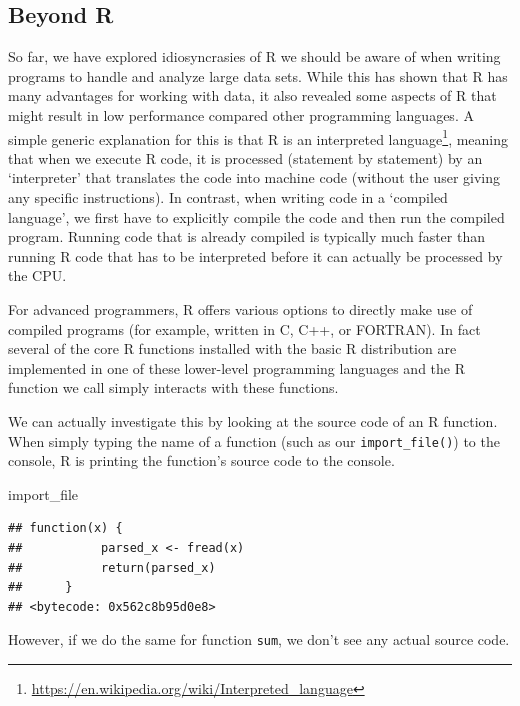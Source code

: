\documentclass[
  12pt,
]{style/krantz}
\newenvironment{Shaded}{\begin{snugshade}}{\end{snugshade}}
\newcommand{\NormalTok}[1]{#1}
\renewcommand{\href}[2]{#2\footnote{\url{#1}}}
\begin{document}
\hypertarget{beyond-r}{%
\subsection{Beyond R}\label{beyond-r}}

So far, we have explored idiosyncrasies of R we should be aware of when writing programs to handle and analyze large data sets. While this has shown that R has many advantages for working with data, it also revealed some aspects of R that might result in low performance compared other programming languages. A simple generic explanation for this is that R is an \href{https://en.wikipedia.org/wiki/Interpreted_language}{interpreted language}, meaning that when we execute R code, it is processed (statement by statement) by an `interpreter' that translates the code into machine code (without the user giving any specific instructions). In contrast, when writing code in a `compiled language', we first have to explicitly compile the code and then run the compiled program. Running code that is already compiled is typically much faster than running R code that has to be interpreted before it can actually be processed by the CPU.

For advanced programmers, R offers various options to directly make use of compiled programs (for example, written in C, C++, or FORTRAN). In fact several of the core R functions installed with the basic R distribution are implemented in one of these lower-level programming languages and the R function we call simply interacts with these functions.

We can actually investigate this by looking at the source code of an R function. When simply typing the name of a function (such as our \texttt{import\_file()}) to the console, R is printing the function's source code to the console.

\begin{Shaded}
\begin{Highlighting}[]
\NormalTok{import\_file}
\end{Highlighting}
\end{Shaded}

\begin{verbatim}
## function(x) {
##           parsed_x <- fread(x)
##           return(parsed_x)
##      }
## <bytecode: 0x562c8b95d0e8>
\end{verbatim}

However, if we do the same for function \texttt{sum}, we don't see any actual source code.
\end{document}
